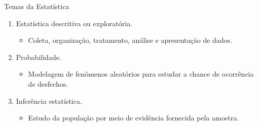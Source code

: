 \documentclass[
  ignorenonframetext,
  serif,
  professionalfont,
  usenames,
  dvipsnames,
  aspectratio = 169]{beamer}
\providecommand{\tightlist}{%
  \setlength{\itemsep}{0pt}\setlength{\parskip}{0pt}}
\renewcommand{\tightlist}{%
  \setlength{\itemsep}{0\baselineskip}
  \setlength{\parskip}{0.25\baselineskip}
}
\begin{document}
\begin{frame}{Temas da Estatística}
\protect\hypertarget{temas-da-estatuxedstica}{}
\begin{enumerate}
\tightlist
\item
  Estatística descritiva ou exploratória.

  \begin{itemize}
  \tightlist
  \item
    Coleta, organização, tratamento, análise e apresentação de dados.
  \end{itemize}
\item
  Probabilidade.

  \begin{itemize}
  \tightlist
  \item
    Modelagem de fenômenos aleatórios para estudar a chance de
    ocorrência de desfechos.
  \end{itemize}
\item
  Inferência estatística.

  \begin{itemize}
  \tightlist
  \item
    Estudo da população por meio de evidência fornecida pela amostra.
  \end{itemize}
\end{enumerate}
\end{frame}
\end{document}
